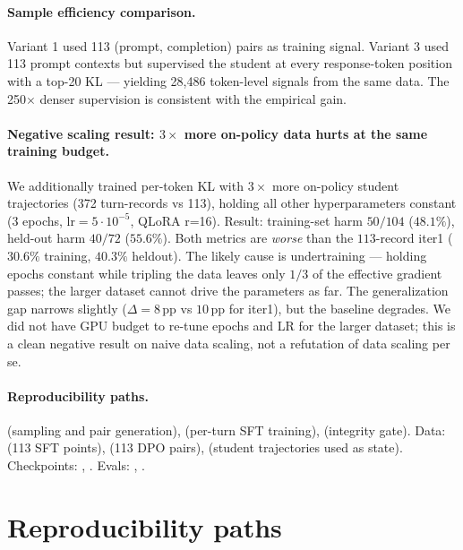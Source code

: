 \documentclass[11pt]{article}
\begin{document}
\paragraph{Sample efficiency comparison.} Variant 1 used 113 (prompt, completion) pairs as training signal. Variant 3 used 113 prompt contexts but supervised the student at every response-token position with a top-20 KL — yielding 28{,}486 token-level signals from the same data. The 250$\times$ denser supervision is consistent with the empirical gain.

\paragraph{Negative scaling result: $3\times$ more on-policy data hurts at the same training budget.} We additionally trained per-token KL with $3\times$ more on-policy student trajectories (372 turn-records vs 113), holding all other hyperparameters constant (3 epochs, lr$=5\!\cdot\!10^{-5}$, QLoRA r=16). Result: training-set harm $50/104$ ($48.1\%$), held-out harm $40/72$ ($55.6\%$). Both metrics are \emph{worse} than the $113$-record iter1 ($30.6\%$ training, $40.3\%$ heldout). The likely cause is undertraining --- holding epochs constant while tripling the data leaves only $1/3$ of the effective gradient passes; the larger dataset cannot drive the parameters as far. The generalization gap narrows slightly ($\Delta = 8\,$pp vs $10\,$pp for iter1), but the baseline degrades. We did not have GPU budget to re-tune epochs and LR for the larger dataset; this is a clean negative result on naive data scaling, not a refutation of data scaling per se.

\paragraph{Reproducibility paths.}  (sampling and pair generation),  (per-turn SFT training),  (integrity gate). Data:  (113 SFT points),  (113 DPO pairs),  (student trajectories used as state). Checkpoints: , . Evals: , .

\section{Reproducibility paths}
\label{app:reproducibility}
\end{document}
